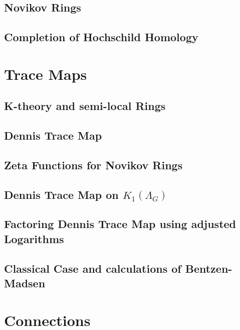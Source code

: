 \documentclass{report}
\begin{document}
\section{Novikov Rings}

\section{Completion of Hochschild Homology}

\chapter{Trace Maps\label{TraceMaps}}
\section{K-theory and semi-local Rings}


\section{Dennis Trace Map}


\section{Zeta Functions for Novikov Rings}


\section{Dennis Trace Map on $K_1(\Lambda_G)$}


\section{Factoring Dennis Trace Map using adjusted Logarithms}

\section{Classical Case and calculations of Bentzen-Madsen}

\chapter{Connections\label{Connections}}
\end{document}
